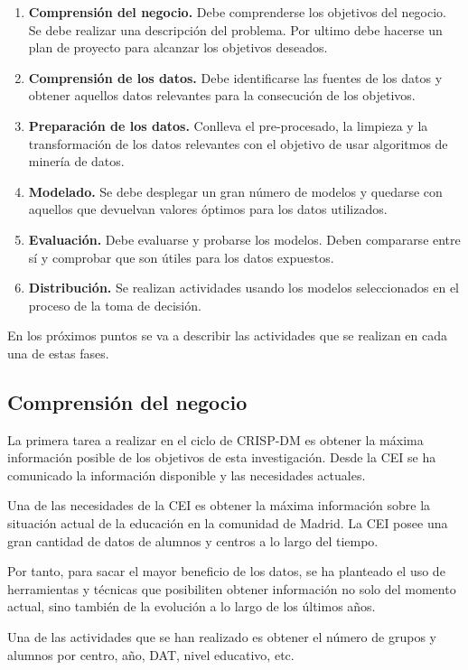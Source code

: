 \begin{enumerate}
	\item \textbf{Comprensión del negocio.} Debe comprenderse los objetivos del negocio. Se debe realizar una descripción del problema. Por ultimo debe hacerse un plan de proyecto para alcanzar los objetivos deseados.
	\item \textbf{Comprensión de los datos.} Debe identificarse las fuentes de los datos y obtener aquellos datos relevantes para la consecución de los objetivos.
	\item \textbf{Preparación de los datos.} Conlleva el pre-procesado, la limpieza y la transformación de los datos relevantes con el objetivo de usar algoritmos de minería de datos.
	\item \textbf{Modelado.} Se debe desplegar un gran número de modelos y quedarse con aquellos que devuelvan valores óptimos para los datos utilizados.
	\item \textbf{Evaluación.} Debe evaluarse y probarse los modelos. Deben compararse entre sí y comprobar que son útiles para los datos expuestos.
	\item \textbf{Distribución.} Se realizan actividades usando los modelos seleccionados en el proceso de la toma de decisión.
\end{enumerate}

En los próximos puntos se va a describir las actividades que se realizan en cada una de estas fases.

\subsection{Comprensión del negocio}
La primera tarea a realizar en el ciclo de CRISP-DM es obtener la máxima información posible de los objetivos de esta investigación. Desde la CEI se ha comunicado la información disponible y las necesidades actuales.

Una de las necesidades de la CEI es obtener la máxima información sobre la situación actual de la educación en la comunidad de Madrid. La CEI posee una gran cantidad de datos de alumnos y centros a lo largo del tiempo. 

Por tanto, para sacar el mayor beneficio de los datos, se ha planteado el uso de herramientas y técnicas que posibiliten obtener información no solo del momento actual, sino también de la evolución a lo largo de los últimos años.

Una de las actividades que se han realizado es obtener el número de grupos y alumnos por centro, año, DAT, nivel educativo, etc.

